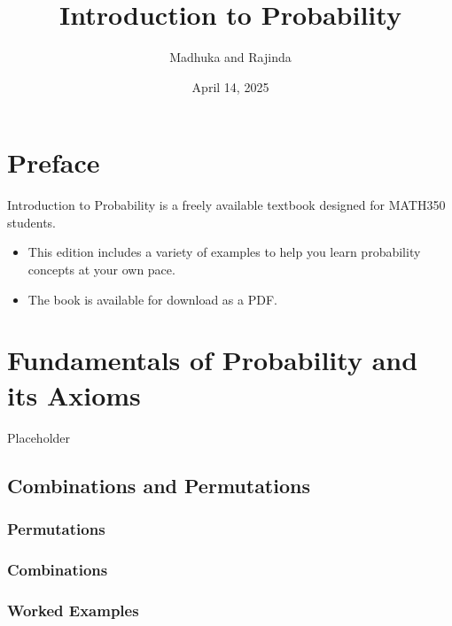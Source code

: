 \documentclass[
  12pt,
]{krantzNoCorner}
\title{Introduction to Probability}
\author{Madhuka and Rajinda}
\date{April 14, 2025}
\providecommand{\tightlist}{%
  \setlength{\itemsep}{0pt}\setlength{\parskip}{0pt}}
\begin{document}
\maketitle

{
\hypersetup{linkcolor=}
\setcounter{tocdepth}{2}
\tableofcontents
}
\hypertarget{preface}{%
\chapter*{Preface}\label{preface}}


Introduction to Probability is a freely available textbook designed for MATH350 students.

\begin{itemize}
\tightlist
\item
  This edition includes a variety of examples to help you learn probability concepts at your own pace.
\item
  The book is available for download as a PDF.
\end{itemize}

\hypertarget{fundamentals-of-probability-and-its-axioms}{%
\chapter{Fundamentals of Probability and its Axioms}\label{fundamentals-of-probability-and-its-axioms}}

Placeholder

\hypertarget{combinations-and-permutations}{%
\section{Combinations and Permutations}\label{combinations-and-permutations}}

\hypertarget{permutations}{%
\subsection{Permutations}\label{permutations}}

\hypertarget{combinations}{%
\subsection{Combinations}\label{combinations}}

\hypertarget{worked-examples}{%
\subsection{Worked Examples}\label{worked-examples}}
\end{document}
